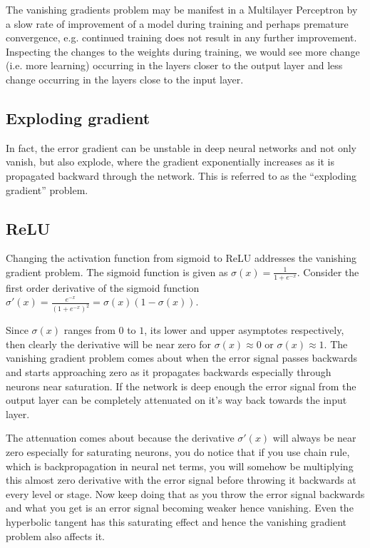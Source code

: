 \documentclass{article}
\begin{document}
The vanishing gradients problem may be manifest in a Multilayer Perceptron by a slow rate of improvement of a model during training and perhaps premature convergence, e.g. continued training does not result in any further improvement. Inspecting the changes to the weights during training, we would see more change (i.e. more learning) occurring in the layers closer to the output layer and less change occurring in the layers close to the input layer.

\subsection{Exploding gradient}

In fact, the error gradient can be unstable in deep neural networks and not only vanish, but also explode, where the gradient exponentially increases as it is propagated backward through the network. This is referred to as the ``exploding gradient'' problem.

\subsection{ReLU}
Changing the activation function from sigmoid to ReLU addresses the vanishing gradient problem.
The sigmoid function is given as $\sigma(x) = \frac{1}{1 + e^{-x}}$.  Consider the first order derivative of the sigmoid function $\sigma'(x) = \frac{e^{-x}}{(1 + e^{-x})^2} = \sigma(x)(1-\sigma(x))$.

Since  $\sigma(x)$  ranges from $0$ to $1$, its lower and upper asymptotes respectively, then clearly the derivative will be near zero for $\sigma(x) \approx 0$ or $\sigma(x) \approx 1$. The vanishing gradient problem comes about when the error signal passes backwards and starts approaching zero as it propagates backwards especially through neurons near saturation. If the network is deep enough the error signal from the output layer can be completely attenuated on it's way back towards the input layer.

The attenuation comes about because the derivative $\sigma'(x)$ will always be near zero especially for saturating neurons, you do notice that if you use chain rule, which is backpropagation in neural net terms, you will somehow be multiplying this almost zero derivative with the error signal before throwing it backwards at every level or stage. Now keep doing that as you throw the error signal backwards and what you get is an error signal becoming weaker hence vanishing. Even the hyperbolic tangent has this saturating effect and hence the vanishing gradient problem also affects it.
\end{document}
